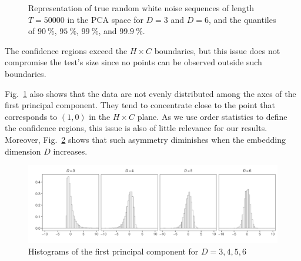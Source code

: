 \documentclass[alpha-refs]{wiley-article}
\begin{document}
\begin{figure}[hbt]
	\centering
	\caption{Representation of true random white noise sequences of length $T = 50000$ in the PCA space for $D = 3$ and $D = 6$, and the quantiles of $\SI{90}{\percent}$, $\SI{95}{\percent}$, $\SI{99}{\percent}$, and $\SI{99.9}{\percent}$.}
	\label{fig:HC-PCA}
\end{figure} 

The confidence regions exceed the $H \times C$ boundaries, but this issue does not compromise the test's size since no points can be observed outside such boundaries.

Fig.~\ref{fig:HC-PCA} also shows that the data are not evenly distributed among the axes of the first principal component.
They tend to concentrate close to the point that corresponds to $(1,0)$ in the $H\times C$ plane.
As we use order statistics to define the confidence regions, this issue is also of little relevance for our results.
Moreover, Fig.~\ref{fig:PCA-Hist} shows that such asymmetry diminishes when the embedding dimension $D$ increases.

\begin{figure}[hbt]
	\centering
	\includegraphics[width=\linewidth]{PCA-hist-50k}
	\caption{Histograms of the first principal component for $D=3,4,5,6$}
	\label{fig:PCA-Hist}
\end{figure}
\end{document}
